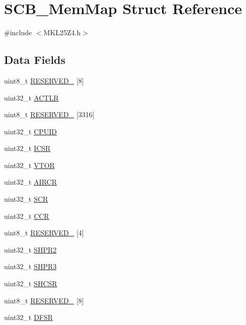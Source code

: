 \hypertarget{struct_s_c_b___mem_map}{}\section{S\+C\+B\+\_\+\+Mem\+Map Struct Reference}
\label{struct_s_c_b___mem_map}


{\ttfamily \#include $<$M\+K\+L25\+Z4.\+h$>$}

\subsection*{Data Fields}
\begin{DoxyCompactItemize}
\item 
uint8\+\_\+t \hyperlink{struct_s_c_b___mem_map_ab5b3e978eb3ceb8a2aadaeeab28db00b}{R\+E\+S\+E\+R\+V\+E\+D\+\_} \mbox{[}8\mbox{]}
\item 
uint32\+\_\+t \hyperlink{struct_s_c_b___mem_map_afffeb2c080fb652c45dcccbc9432945c}{A\+C\+T\+LR}
\item 
uint8\+\_\+t \hyperlink{struct_s_c_b___mem_map_ab9f88fe5f82d75e61ca9e017c80bcca7}{R\+E\+S\+E\+R\+V\+E\+D\+\_} \mbox{[}3316\mbox{]}
\item 
uint32\+\_\+t \hyperlink{struct_s_c_b___mem_map_a1e5baee14946bb64bd1e68e481f6d6b0}{C\+P\+U\+ID}
\item 
uint32\+\_\+t \hyperlink{struct_s_c_b___mem_map_a66ceabdaf0762f2f5935c87b80e0b246}{I\+C\+SR}
\item 
uint32\+\_\+t \hyperlink{struct_s_c_b___mem_map_a3799e3af2b9f5d2f0740354953ba509d}{V\+T\+OR}
\item 
uint32\+\_\+t \hyperlink{struct_s_c_b___mem_map_ad69a7e2aba70bd9fa6924533a23a062a}{A\+I\+R\+CR}
\item 
uint32\+\_\+t \hyperlink{struct_s_c_b___mem_map_ae6694fb5a69483450401814d4d2aadae}{S\+CR}
\item 
uint32\+\_\+t \hyperlink{struct_s_c_b___mem_map_a9f5754479885a80651e6ce99ce44fbeb}{C\+CR}
\item 
uint8\+\_\+t \hyperlink{struct_s_c_b___mem_map_acc19a07675d1806592b3ed4a92f91e1c}{R\+E\+S\+E\+R\+V\+E\+D\+\_} \mbox{[}4\mbox{]}
\item 
uint32\+\_\+t \hyperlink{struct_s_c_b___mem_map_a4fa6448cb8510e61433afa5f024a1579}{S\+H\+P\+R2}
\item 
uint32\+\_\+t \hyperlink{struct_s_c_b___mem_map_aa7e2c4b036de2b98b1b578b4e638978c}{S\+H\+P\+R3}
\item 
uint32\+\_\+t \hyperlink{struct_s_c_b___mem_map_aabb6b7677f7a0a50ce6fae3b63eb943d}{S\+H\+C\+SR}
\item 
uint8\+\_\+t \hyperlink{struct_s_c_b___mem_map_a86684537b595133db57a7bcc73843d2a}{R\+E\+S\+E\+R\+V\+E\+D\+\_} \mbox{[}8\mbox{]}
\item 
uint32\+\_\+t \hyperlink{struct_s_c_b___mem_map_ae8d2d700d6a9735423a52a48a62b50b6}{D\+F\+SR}
\end{DoxyCompactItemize}


